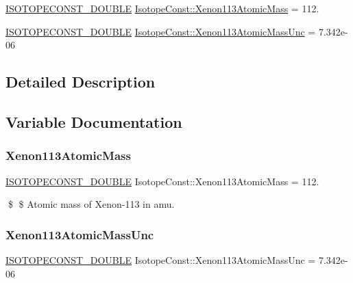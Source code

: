\begin{DoxyCompactItemize}
\item 
\mbox{\hyperlink{group___isotope_const-_macros_ga8f45a7272ce02c0b4c65c44636ed719a}{I\+S\+O\+T\+O\+P\+E\+C\+O\+N\+S\+T\+\_\+\+D\+O\+U\+B\+LE}} \mbox{\hyperlink{group___isotope_const-_xenon-_xe113_gafb6c9d083024edfd9872e1d3cb39bfb7}{Isotope\+Const\+::\+Xenon113\+Atomic\+Mass}} = 112.
\item 
\mbox{\hyperlink{group___isotope_const-_macros_ga8f45a7272ce02c0b4c65c44636ed719a}{I\+S\+O\+T\+O\+P\+E\+C\+O\+N\+S\+T\+\_\+\+D\+O\+U\+B\+LE}} \mbox{\hyperlink{group___isotope_const-_xenon-_xe113_gabc9de7247566155e1fa8af54f38f850c}{Isotope\+Const\+::\+Xenon113\+Atomic\+Mass\+Unc}} = 7.\+342e-\/06
\end{DoxyCompactItemize}


\subsection{Detailed Description}


\subsection{Variable Documentation}
\mbox{\label{group___isotope_const-_xenon-_xe113_gafb6c9d083024edfd9872e1d3cb39bfb7}} 
\subsubsection{\texorpdfstring{Xenon113\+Atomic\+Mass}{Xenon113AtomicMass}}
{\footnotesize\ttfamily \mbox{\hyperlink{group___isotope_const-_macros_ga8f45a7272ce02c0b4c65c44636ed719a}{I\+S\+O\+T\+O\+P\+E\+C\+O\+N\+S\+T\+\_\+\+D\+O\+U\+B\+LE}} Isotope\+Const\+::\+Xenon113\+Atomic\+Mass = 112.}

\$ \$ Atomic mass of Xenon-\/113 in amu. \mbox{\label{group___isotope_const-_xenon-_xe113_gabc9de7247566155e1fa8af54f38f850c}} 
\subsubsection{\texorpdfstring{Xenon113\+Atomic\+Mass\+Unc}{Xenon113AtomicMassUnc}}
{\footnotesize\ttfamily \mbox{\hyperlink{group___isotope_const-_macros_ga8f45a7272ce02c0b4c65c44636ed719a}{I\+S\+O\+T\+O\+P\+E\+C\+O\+N\+S\+T\+\_\+\+D\+O\+U\+B\+LE}} Isotope\+Const\+::\+Xenon113\+Atomic\+Mass\+Unc = 7.\+342e-\/06}

